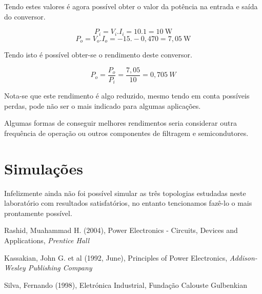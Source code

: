 \documentclass[a4paper,11pt]{article}
\numberwithin{equation}{section}
\begin{document}
Tendo estes valores é agora possível obter o valor da potência na entrada e saída do conversor.

\begin{equation}
P_i = V_i . I_i = 10 . 1 = 10  ~ \text{W}
\end{equation}
\vspace{-0,8 cm}
\begin{equation}
P_o = V_o . I_o = -15 . -0,470 = 7,05  ~ \text{W}
\end{equation}

Tendo isto é possível obter-se o rendimento deste conversor.

\begin{equation}
P_o = \frac{P_o}{P_i} = \frac{7,05}{10} = 0,705 ~ W
\end{equation}

Nota-se que este rendimento é algo reduzido, mesmo tendo em conta possíveis perdas, pode não ser o mais indicado para algumas aplicações.

Algumas formas de conseguir melhores rendimentos seria considerar outra frequência de operação ou outros componentes de filtragem e semicondutores.

\pagebreak

\section{Simulações}

Infelizmente ainda não foi possível simular as três topologias estudadas neste laboratório com resultados satisfatórios, no entanto tencionamos fazê-lo o mais prontamente possível.

\pagebreak

\begin{thebibliography}{2}
	
	Rashid, Muahammad H. (2004), Power Electronics - Circuits, Devices and Applications, \textit{Prentice Hall}	
	
	Kassakian, John G. et al (1992, June), Principles of Power Electronics, \textit{Addison-Wesley Publishing Company}
	
	Silva, Fernando (1998), Eletrónica Industrial, Fundação Calouste Gulbenkian
	
\end{thebibliography}


\pagebreak
\end{document}
